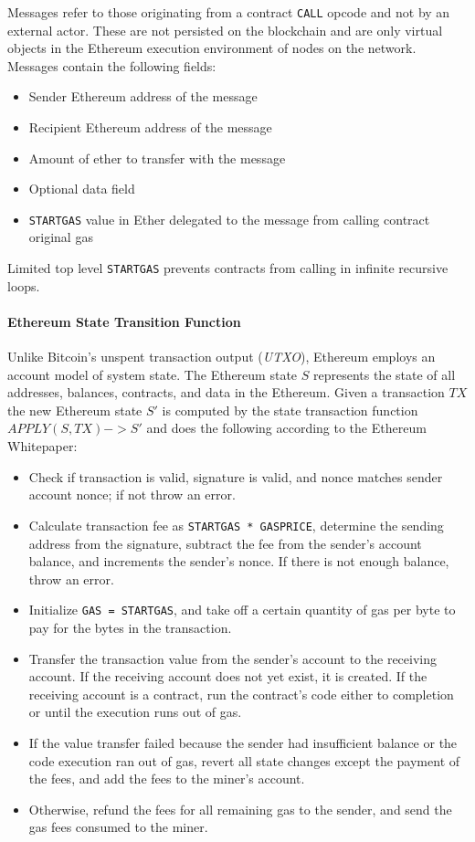 \documentclass[a4paper,12pt]{article} %
\def\code#1{\texttt{#1}}
\begin{document}
Messages refer to those originating from a contract \code{CALL} opcode and not by an external actor. These are not persisted on the blockchain and are only virtual objects in the Ethereum execution environment of nodes on the network. Messages contain the following fields:

\begin{itemize}
	\item Sender Ethereum address of the message
	\item Recipient Ethereum address of the message
	\item Amount of ether to transfer with the message
	\item Optional data field
	\item \code{STARTGAS} value in Ether delegated to the message from calling contract original gas
\end{itemize}

Limited top level \code{STARTGAS} prevents contracts from calling in infinite recursive loops.

\paragraph*{Ethereum State Transition Function}

Unlike Bitcoin's unspent transaction output (\textit{UTXO}), Ethereum employs an account model of system state. The Ethereum state $S$ represents the state of all addresses, balances, contracts, and data in the Ethereum. Given a transaction $TX$ the new Ethereum state $S'$ is computed by the state transaction function $APPLY(S,TX) -> S'$ and does the following according to the Ethereum Whitepaper\cite{whitepaper}:

\begin{itemize}
	\item Check if transaction is valid, signature is valid, and nonce matches sender account nonce; if not throw an error.
	\item Calculate transaction fee as \code{STARTGAS * GASPRICE}, determine the sending address from the signature, subtract the fee from the sender's account balance, and increments the sender's nonce. If there is not enough balance, throw an error.
	\item Initialize \code{GAS = STARTGAS}, and take off a certain quantity of gas per byte to pay for the bytes in the transaction.
	\item Transfer the transaction value from the sender's account to the receiving account. If the receiving account does not yet exist, it is created. If the receiving account is a contract, run the contract's code either to completion or until the execution runs out of gas.
	\item If the value transfer failed because the sender had insufficient balance or the code execution ran out of gas, revert all state changes except the payment of the fees, and add the fees to the miner's account.
	\item Otherwise, refund the fees for all remaining gas to the sender, and send the gas fees consumed to the miner.
\end{itemize}
\end{document}
